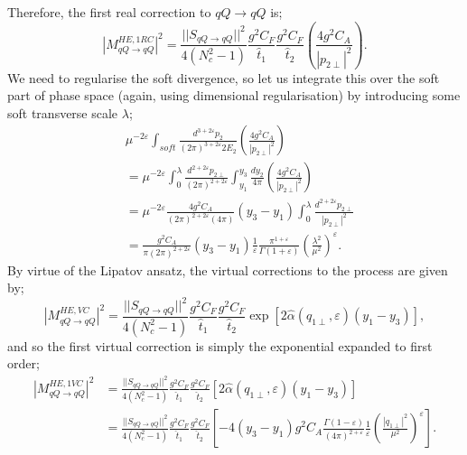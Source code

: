 
Therefore, the first real correction to $qQ \to qQ$ is;
\begin{equation}
|M_{qQ \to qQ}^{HE, 1RC}|^2 = \frac{||S_{qQ \to qQ}||^2}{4 (N_c^2 - 1)}\frac{g^2 C_{F}}{\hat{t}_1} \frac{g^2 C_{F}}{\hat{t}_2} \left(\frac{4g^2 C_A}{|p_{2 \perp}|^2} \right).
\end{equation}
We need to regularise the soft divergence, so let us integrate this over the soft part of phase space (again, using dimensional regularisation) by introducing some soft transverse scale $\lambda$;
\begin{equation}
\begin{split}
& \mu^{-2 \varepsilon} \int_{soft} \frac{d^{3 + 2 \varepsilon}p_2}{(2 \pi)^{3 + 2 \varepsilon} 2E_2} \left(\frac{4g^2 C_A}{|p_{2 \perp}|^2} \right) \\
& = \mu^{-2 \varepsilon} \int_0^\lambda \frac{d^{2 + 2 \varepsilon}p_{2 \perp}}{(2 \pi)^{2 + 2 \varepsilon}} \int_{y_1}^{y_3} \frac{d y_2}{4 \pi} \left(\frac{4g^2 C_A}{|p_{2 \perp}|^2} \right) \\
&= \mu^{-2 \varepsilon} \frac{4 g^2 C_A}{(2 \pi)^{2 + 2\varepsilon}(4 \pi)} (y_3 - y_1) \int_0^\lambda \frac{d^{2 + 2 \varepsilon}p_{2\perp}}{|p_{2 \perp}|^2} \\
&= \frac{g^2 C_A}{\pi (2 \pi)^{2 + 2 \varepsilon}} (y_3 - y_1) \frac{1}{\varepsilon} \frac{\pi^{1 + \varepsilon}}{\Gamma(1 + \varepsilon)} \left( \frac{\lambda^2}{\mu^2}\right)^\varepsilon.
\end{split}
\end{equation}
By virtue of the Lipatov ansatz, the virtual corrections to the process are given by;
\begin{equation}
|M_{qQ \to qQ}^{HE, VC}|^2 = \frac{||S_{qQ \to qQ}||^2}{4 (N_c^2 - 1)}\frac{g^2 C_{F}}{\hat{t}_1} \frac{g^2 C_{F}}{\hat{t}_2} \exp \left[2 \hat{\alpha}(q_{1 \perp}, \varepsilon)(y_1 - y_3) \right],
\end{equation}
and so the first virtual correction is simply the exponential expanded to first order;
\begin{equation}
\begin{split}
|M_{qQ \to qQ}^{HE, 1VC}|^2 &= \frac{||S_{qQ \to qQ}||^2}{4 (N_c^2 - 1)}\frac{g^2 C_{F}}{\hat{t}_1} \frac{g^2 C_{F}}{\hat{t}_2} \left[2 \hat{\alpha}(q_{1 \perp}, \varepsilon)(y_1 - y_3) \right] \\
& = \frac{||S_{qQ \to qQ}||^2}{4 (N_c^2 - 1)}\frac{g^2 C_{F}}{\hat{t}_1} \frac{g^2 C_{F}}{\hat{t}_2} \left[- 4 (y_3 - y_1) g^2 C_A \frac{\Gamma(1 - \varepsilon)}{(4 \pi)^{2 + \varepsilon}} \frac{1}{\varepsilon}  \left( \frac{|q_{1 \perp}|^2}{\mu^2}\right)^\varepsilon \right].
\end{split}
\end{equation}
